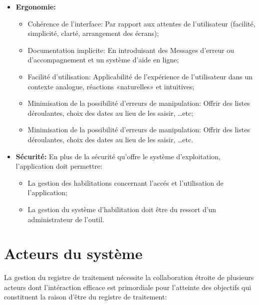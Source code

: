 \begin{itemize}
    \item \textbf{Ergonomie:}
    \begin{itemize}
        \item Cohérence de l'interface: Par rapport aux attentes de l'utilisateur (facilité, simplicité, clarté, arrangement des écrans);
        \item Documentation implicite: En introduisant des Messages d'erreur ou d’accompagnement et un système d'aide en ligne;
        \item Facilité d'utilisation: Applicabilité de l'expérience de l'utilisateur dans un contexte analogue, réactions «naturelles» et intuitives;
        \item  Minimisation de la possibilité d'erreurs de manipulation: Offrir des listes déroulantes, choix des dates au lieu de les saisir, …etc; 
        \item  Minimisation de la possibilité d'erreurs de manipulation: Offrir des listes déroulantes, choix des dates au lieu de les saisir, …etc.
    \end{itemize}
    \item \textbf{Sécurité:} En plus de la sécurité qu'offre le système d'exploitation, l'application doit permettre:
    \begin{itemize}
        \item La gestion des habilitations concernant l'accés et l'utilisation de l'application;
        \item La gestion du système d'habilitation doit être du ressort d'un administrateur de l'outil.
    \end{itemize}
\end{itemize}

\clearpage

\section{Acteurs du système}
La gestion du registre de traitement nécessite la collaboration étroite de plusieurs acteurs dont l'intéraction efficace est primordiale pour l'atteinte des objectifs qui constituent la raison d'être du registre de traitement: \\


